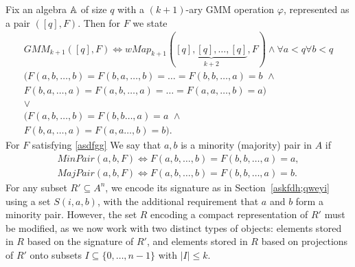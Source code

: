 \documentclass{article}
\newcommand{\A}{\ensuremath\mathbb{A}}
\theoremstyle{definition}
\theoremstyle{theorem}
\theoremstyle{theorem}
\theoremstyle{remark}
\theoremstyle{remark}
\theoremstyle{example}
\theoremstyle{notation}
\theoremstyle{theorem}
\begin{document}
Fix an algebra $\A$ of size $q$ with a $(k+1)$-ary GMM operation $\varphi$, represented as a pair $([q], F)$. Then for $F$ we state
\begin{equation}\label{asdfgg}
    \begin{gathered}
        GMM_{k+1}([q], F) \iff wMap_{k+1}(\underbrace{[q],[q],\ldots,[q]}_{k+2}, F) \wedge \forall a<q\forall b <q\\
\big(F(a, b, \ldots , b) = F(b, a, \ldots , b) = \ldots = F(b, b, \ldots , a) = b   \,\,\wedge\,\,\,\,\,\\
F(b, a, \ldots , a) = F(a, b, \ldots , a) = \ldots = F(a, a, \ldots , b) = a \big) \\
\vee\\
\big( F(a,b,\ldots,b) = F(b,b\ldots ,a) = a \,\,\wedge\,\,\,\,\,\\
F(b,a,\ldots,a) = F(a,a\ldots ,b) = b\big) .
    \end{gathered}
\end{equation}
For $F$ satisfying \eqref{asdfgg} We say that $a,b$ is a minority (majority) pair in $A$ if
\begin{equation}
    \begin{gathered}
        MinPair(a,b,F)\iff F(a,b,\ldots,b) = F(b,b,\ldots,a) = a, \\
        MajPair(a,b,F) \iff F(a,b,\ldots,b) = F(b,b,\ldots,a) = b.
    \end{gathered}
\end{equation}
For any subset $R' \subseteq A^n$, we encode its signature as in Section~\ref{askfdh;qweyi} using a set $S(i, a, b)$, with the additional requirement that $a$ and $b$ form a minority pair. However, the set $R$ encoding a compact representation of $R'$ must be modified, as we now work with two distinct types of objects: elements stored in $R$ based on the signature of $R'$, and elements stored in $R$ based on projections of $R'$ onto subsets $I \subseteq \{0, \ldots, n - 1\}$ with $|I| \leq k$.
\end{document}
